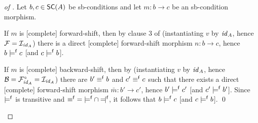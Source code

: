 \begin{proof}[of ]
Let $b,c\in \SC A$ be sb-conditions and let $m:b\to c$ be an sb-condition morphism.
\begin{itemizeS}
\item If $m$ is [complete] forward-shift, then by clause 3 of  (instantiating $v$ by $\mathit{id}_A$, hence $\mathcal{F}=\mathcal{I}_{\mathit{id}_A}$) there is a direct [complete] forward-shift morphism $n:b\to c$, hence $b\models^{\mathsf f} c$ [and $c\models^{\mathsf f} b$].
\item If $m$ is [complete] backward-shift, then by  (instantiating $v$ by $\mathit{id}_A$, hence $\mathcal{B}=\mathcal{F}^\circ_{\mathit{id}_A}=\mathcal{I}_{\mathit{id}_A}$) there are $b'\equiv^{\mathsf f} b$ and $c'\equiv^{\mathsf f} c$ such that there exists a direct [complete] forward-shift morphism $\bar m:b'\to c'$, hence $b'\models^{\mathsf f} c'$ [and $c'\models^{\mathsf f} b'$]. Since $\models^{\mathsf f}$ is transitive and ${\pequiv}={\pentails}\cap{\pentailedby}$, it follows that $b\models^{\mathsf f} c$ [and $c\models^{\mathsf f} b$].
\qed
\end{itemizeS}
\end{proof}
